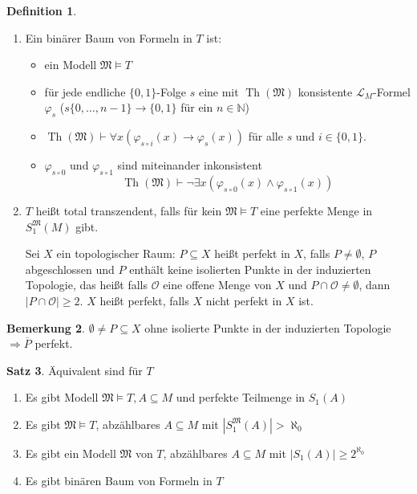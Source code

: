 \documentclass[12pt,parskip=full]{scrartcl}
\newcommand{\setN}{\mathbb{N}}
\newcommand{\abs}[1]{{\left| #1 \right|}}
\theoremstyle{definition}
\newtheorem{theorem}{Satz}[section]
\newtheorem{definition}[theorem]{Definition}
\newtheorem{remark}[theorem]{Bemerkung}
\begin{document}
	\begin{definition}
		\begin{enumerate}
			\item Ein binärer Baum von Formeln in $T$ ist:
			\begin{itemize}
				\item ein Modell $\mathfrak{M} \models T$
				\item für jede endliche $\{ 0,1 \}$-Folge $s$ eine mit $\operatorname{Th}(\mathfrak{M})$ konsistente $\mathcal{L}_M$-Formel $\varphi_s$ ($s \{ 0, \dots, n-1 \} \to \{ 0,1 \}$ für ein $n \in \setN$)
				\item $\operatorname{Th}(\mathfrak{M}) \vdash \forall x (\varphi_{s \circ i}(x) \to \varphi_s(x))$ für alle $s$ und $i \in \{0,1\}$.
				\item $\varphi_{s \circ 0}$ und $\varphi_{s \circ 1}$ sind miteinander inkonsistent
				\begin{equation*}
					\operatorname{Th}(\mathfrak{M}) \vdash \lnot \exists x(\varphi_{s \circ 0}(x) \land \varphi_{s \circ 1}(x) )
				\end{equation*}
			\end{itemize}
			\item $T$ heißt total transzendent, falls für kein $\mathfrak{M} \models T$ eine perfekte Menge in $S_1^\mathfrak{M}(M)$ gibt.
			
			Sei $X$ ein topologischer Raum: $P \subseteq X$ heißt perfekt in $X$, falls $P \neq \emptyset$, $P$ abgeschlossen und $P$ enthält keine isolierten Punkte in der induzierten Topologie, das heißt falls $\mathcal{O}$ eine offene Menge von $X$ und $P \cap \mathcal{O} \neq \emptyset$, dann $\abs{P \cap \mathcal{O}} \geq 2$. $X$ heißt perfekt, falls $X$ nicht perfekt in $X$ ist.
		\end{enumerate}
	\end{definition}

	\begin{remark}
		$\emptyset \neq P \subseteq X$ ohne isolierte Punkte in der induzierten Topologie $\Rightarrow \overline{P}$ perfekt.
	\end{remark}

	\begin{theorem}
		Äquivalent sind für $T$
		\begin{enumerate}
			\item Es gibt Modell $\mathfrak{M} \models T, A \subseteq M$ und perfekte Teilmenge in $S_1(A)$
			\item Es gibt $\mathfrak{M} \models T$, abzählbares $A \subseteq M$ mit $\abs{S_1^\mathfrak{M}(A)} > \aleph_0$
			\item Es gibt ein Modell $\mathfrak{M}$ von $T$, abzählbares $A \subseteq M$ mit $\abs{S_1(A)} \geq 2^{\aleph_0}$
			\item Es gibt binären Baum von Formeln in $T$
		\end{enumerate}
	\end{theorem}
\end{document}
